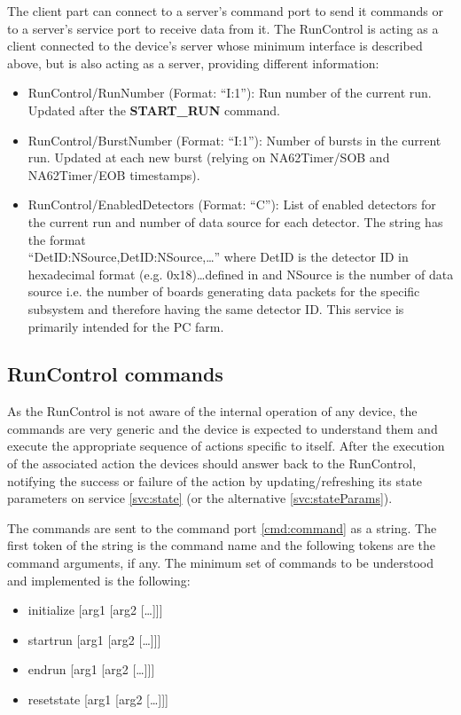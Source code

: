 \documentclass[a4paper]{article}
\begin{document}
The client part can connect to a server's command port to send it commands or to a server's
service port to receive data from it. The RunControl is acting as a client connected to the device's
server whose minimum interface is described above, but is also acting as a server, providing different information:
\begin{itemize}
	\item RunControl/RunNumber (Format: ``I:1''): Run number of the current run.
	Updated after the \textbf{START\_RUN} command.
	\item RunControl/BurstNumber (Format: ``I:1''): Number of bursts in the current
	run. Updated at each new burst (relying on NA62Timer/SOB and NA62Timer/EOB
	timestamps).
	\item RunControl/EnabledDetectors (Format: ``C''): List of enabled detectors for the current run
	and number of data source for each detector. The string has the format\\ 
	\mbox{``DetID:NSource,DetID:NSource,\ldots''} where DetID is the detector ID in hexadecimal format
	(e.g. 0x18)\ldots defined in \cite{biblio:TDAQNote} and NSource is the number
	of data source i.e. the number of boards generating data packets for the
	specific subsystem and therefore having the same detector ID. This service is
	primarily intended for the PC farm.
\end{itemize}

\subsection{RunControl commands}\label{sec:commands}

As the RunControl is not aware of the internal operation of any device, the commands are very
generic and the device is expected to understand them and execute the appropriate sequence of actions
specific to itself. After the execution of the associated action the devices should answer back to
the RunControl, notifying the success or failure of the action by updating/refreshing its state
parameters on service \ref{svc:state} (or the alternative \ref{svc:stateParams}).

The commands are sent to the command port \ref{cmd:command} as a string. The first token of the
string is the command name and the following tokens are the command arguments, if any. The minimum
set of commands to be understood and implemented is the following:
\begin{itemize}
	\item initialize [arg1 [arg2 [\ldots]]]
	\item startrun [arg1 [arg2 [\ldots]]]
	\item endrun [arg1 [arg2 [\ldots]]]
	\item resetstate [arg1 [arg2 [\ldots]]]
\end{itemize}
\end{document}
